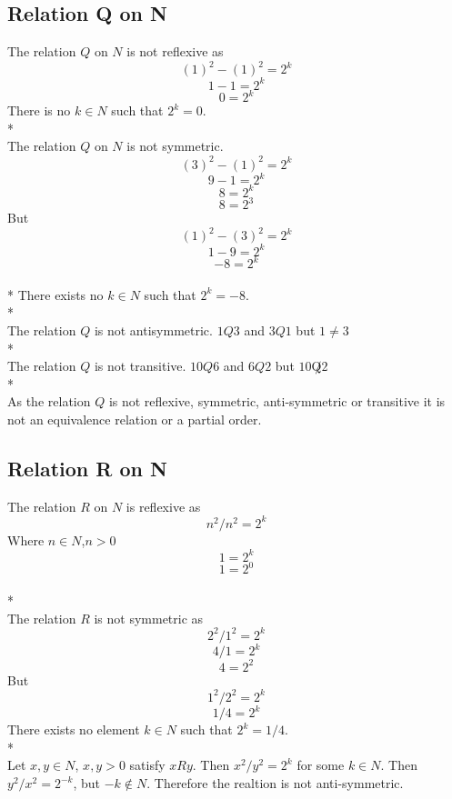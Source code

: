 \documentclass[a4paper,12pt]{article}
\begin{document}
\subsection{Relation Q on N}
The relation $Q$ on $N$ is not reflexive as \[(1)^2 - (1)^2 = 2^k\]
\[1 - 1 = 2^k\]
\[0 = 2^k\]
There is no $k \in N$ such that $2^k = 0$.
\\*
\\
The relation $Q$ on $N$ is not symmetric. \[(3)^2 - (1)^2 = 2^k\]
\[9 -1 = 2^k\]
\[8 = 2^k\]
\[8 = 2^3\]
But \[(1)^2 - (3)^2 = 2^k\]
\[1 - 9 = 2^k\]
\[ -8 = 2^k \]
\\*
There exists no $k \in N$ such that $2^k = -8$.
\\*
\\
The relation $Q$ is not antisymmetric. $1Q3$ and $3Q1$ but $ 1 \not= 3$
\\* 
\\
The relation $Q$ is not transitive. $10Q6$ and $6Q2$ but $10\not Q 2$
\\*
\\
As the relation $Q$ is not reflexive, symmetric, anti-symmetric or transitive it is not an equivalence 
relation or a partial order.
\subsection{Relation R on N}
The relation $R$ on $N$ is reflexive as \[n^2 / n^2 = 2^k\]
Where $n \in N$,$n > 0$
\[1 = 2^k\]
\[1 = 2^0\]
\\*
\\
The relation $R$ is not symmetric as \[ 2^2 / 1^2 = 2^k\]
\[4 / 1 = 2^k\]
\[ 4 = 2^2\]
But \[ 1^2 / 2^2 = 2^k\]
\[ 1 / 4 = 2^k\]
There exists no element $k \in N$ such that $2^k = 1/4$.
\\*
\\
Let $x,y \in N$, $x,y > 0$ satisfy $xRy$. Then $x^2 / y^2 = 2^k$ for some $k \in N$.
Then $y^2 / x^2 = 2^{-k}$, but $-k \notin N$. Therefore the realtion is not anti-symmetric.
\end{document}
